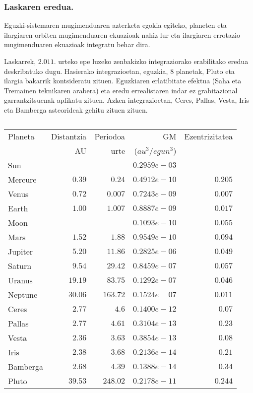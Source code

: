 \subsubsection*{Laskaren eredua.}

Eguzki-sistemaren mugimenduaren azterketa egokia egiteko, planeten eta ilargiaren orbiten mugimenduaren ekuazioak nahiz lur eta ilargiaren errotazio mugimenduaren ekuazioak integratu behar dira. 

Laskarrek, $2.011.$ urteko epe luzeko zenbakizko integraziorako \cite{Laskar2011} erabilitako eredua deskribatuko dugu. Hasierako integrazioetan, eguzkia, 8 planetak, Pluto eta ilargia bakarrik kontsideratu zituen. Eguzkiaren erlatibitate efektua (Saha eta Tremainen \cite{Saha1994} teknikaren arabera) eta eredu errealistaren indar ez grabitazional garrantzitsuenak aplikatu zituen. Azken integrazioetan, Ceres, Pallas, Vesta, Iris eta Bamberga asteorideak gehitu zituen zituen.  
 

\begin{table} [h!]
\caption{}
\label{tab:laskp}       %
\begin{tabular}{l r r r r } 
\hline
 Planeta   &  Distantzia   & Periodoa    & GM             & Ezentrizitatea \\   
           &   AU          &   urte      & ($au^3/egun^3$) & \\ \hline
 Sun       &               &             & $0.2959e-03$   & \\          
 Mercure   &   $0.39$      &  $0.24$     & $0.4912e-10$   & $0.205$ \\
 Venus     &   $0.72$      &  $0.007$    & $0.7243e-09$   & $0.007$\\
 Earth     &   $1.00$      &  $1.007$    & $0.8887e-09$   & $0.017$\\
 Moon      &               &             & $0.1093e-10$   & $0.055$\\ 
 Mars      &   $1.52$      &  $1.88$     & $0.9549e-10$   & $0.094$\\ \hline
 Jupiter   &   $5.20$      &  $11.86$    & $0.2825e-06$   & $0.049$\\
 Saturn    &   $9.54$      &  $29.42$    & $0.8459e-07$   & $0.057$\\ 
 Uranus    &   $19.19$     &  $83.75$    & $0.1292e-07$   & $0.046$\\
 Neptune   &   $30.06$     &  $163.72$   & $0.1524e-07$   & $0.011$ \\ \hline
 Ceres     &   $2.77$      &  $4.6$      & $0.1400e-12$   & $0.07$ \\
 Pallas    &   $2.77$      &  $4.61$     & $0.3104e-13$   & $0.23$ \\
 Vesta     &   $2.36$      &  $3.63$     & $0.3854e-13$   & $0.08$\\
 Iris      &   $2.38$      &  $3.68$     & $0.2136e-14$   & $0.21$ \\
 Bamberga  &   $2.68$      &  $4.39$     & $0.1388e-14$   & $0.34$ \\ \hline
 Pluto     &   $39.53$     &  $248.02$   & $0.2178e-11$   & $0.244$ \\
\hline
\end{tabular}
\end{table}

